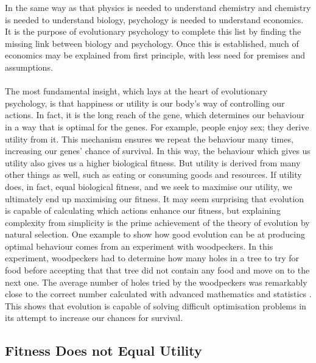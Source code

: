 \documentclass[a4paper,10pt]{article}
\numberwithin{equation}{section}
\begin{document}
In the same way as that physics is needed to understand chemistry and chemistry is needed to understand biology, psychology is needed to understand economics. It is the purpose of evolutionary psychology to complete this list by finding the missing link between biology and psychology. Once this is established, much of economics may be explained from first principle, with less need for premises and assumptions.\\
\\
The most fundamental insight, which lays at the heart of evolutionary psychology, is that happiness or utility is our body's way of controlling our actions. In fact, it is the long reach of the gene, which determines our behaviour in a way that is optimal for the genes. For example, people enjoy sex; they derive utility from it. This mechanism ensures we repeat the behaviour many times, increasing our genes' chance of survival. In this way, the behaviour which gives us utility also gives us a higher biological fitness. But utility is derived from many other things as well, such as eating or consuming goods and resources. If utility does, in fact, equal biological fitness, and we seek to maximise our utility, we ultimately end up maximising our fitness. It may seem surprising that evolution is capable of calculating which actions enhance our fitness, but explaining complexity from simplicity is the prime achievement of the theory of evolution by natural selection. One example to show how good evolution can be at producing optimal behaviour comes from an experiment with woodpeckers. In this experiment, woodpeckers had to determine how many holes in a tree to try for food before accepting that that tree did not contain any food and move on to the next one. The average number of holes tried by the woodpeckers was remarkably close to the correct number calculated with advanced mathematics and statistics \cite{Wilkinson2008}. This shows that evolution is capable of solving difficult optimisation problems in its attempt to increase our chances for survival.


\subsection{Fitness Does not Equal Utility}
\label{sec:Fitness Does not Equal Utility}
\end{document}
